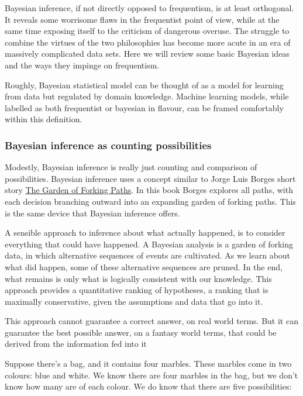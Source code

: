 \documentclass{article}
\begin{document}
Bayesian inference, if not directly opposed to frequentism, is at least
orthogonal. It reveals some worrisome flaws in the frequentist point of
view, while at the same time exposing itself to the criticism of
dangerous overuse. The struggle to combine the virtues of the two
philosophies has become more acute in an era of massively complicated
data sets. Here we will review some basic Bayesian ideas and the ways
they impinge on frequentism.

Roughly, Bayesian statistical model can be thought of as a model for
learning from data but regulated by domain knowledge. Machine learning
models, while labelled as both frequentist or bayesian in flavour, can
be framed comfortably within this definition.

\hypertarget{bayesian-inference-as-counting-possibilities}{%
\subsubsection{Bayesian inference as counting
possibilities}\label{bayesian-inference-as-counting-possibilities}}

Modestly, Bayesian inference is really just counting and comparison of
possibilities. Bayesian inference uses a concept similar to Jorge Luis
Borges short story
\href{https://en.wikipedia.org/wiki/The_Garden_of_Forking_Paths}{The
Garden of Forking Paths}. In this book Borges explores all paths, with
each decision branching outward into an expanding garden of forking
paths. This is the same device that Bayesian inference offers.

A sensible approach to inference about what actually happened, is to
consider everything that could have happened. A Bayesian analysis is a
garden of forking data, in which alternative sequences of events are
cultivated. As we learn about what did happen, some of these alternative
sequences are pruned. In the end, what remains is only what is logically
consistent with our knowledge. This approach provides a quantitative
ranking of hypotheses, a ranking that is maximally conservative, given
the assumptions and data that go into it.

This approach cannot guarantee a correct answer, on real world terms.
But it can guarantee the best possible answer, on a fantasy world terms,
that could be derived from the information fed into it

Suppose there's a bag, and it contains four marbles. These marbles come
in two colours: blue and white. We know there are four marbles in the
bag, but we don't know how many are of each colour. We do know that
there are five possibilities:
\end{document}

